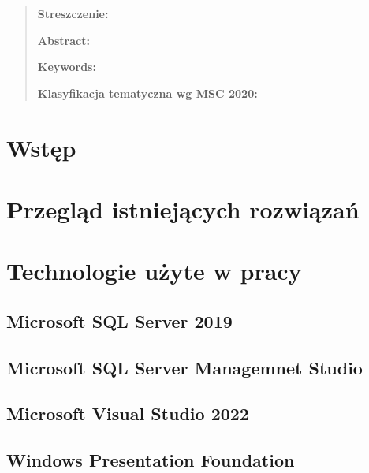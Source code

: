 \documentclass[12pt,twoside]{report}
\begin{document}
	\thispagestyle{empty}
	\mbox{}
	
	\begin{quote}{\small 
			\noindent
			
			\bigskip
			\noindent
			\textbf{Streszczenie:} 
			
			
			\noindent
			\newline
			\textbf{}
			\vspace{5pt}
			
			\noindent
			\newline
			\textbf{Abstract:} 
			\vspace{5pt}
			
			\vspace{5pt}
			\noindent
			\newline
			\textbf{Keywords:} 
			\vspace{5pt}
			\bigskip
			
			\noindent 
			\textbf{Klasyfikacja tematyczna wg  MSC 2020:}}
	\end{quote}

	\mbox{}
	
	\pagestyle{plain}
	\tableofcontents
	\thispagestyle{empty}
	
	
	\newpage
	\setcounter{page}{1}
	\newpage
\chapter{Wstęp}
\chapter{Przegląd istniejących rozwiązań}
\chapter{Technologie użyte w pracy}
\section{Microsoft SQL Server 2019}
\section{Microsoft SQL Server Managemnet Studio}
\section{Microsoft Visual Studio 2022}
\section{Windows Presentation Foundation}
\end{document}
